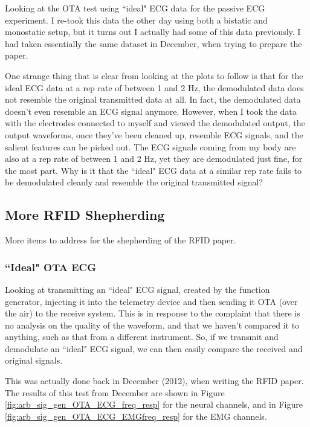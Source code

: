 \documentclass[12pt,onecolumn,titlepage]{article}
\begin{document}
\indent \indent Looking at the OTA test using ``ideal" ECG data for the passive ECG experiment. I re-took this data the other day using both a bistatic and monostatic setup, but it turns out I actually had some of this data previously. I had taken essentially the same dataset in December, when trying to prepare the paper.

One strange thing that is clear from looking at the plots to follow is that for the ideal ECG data at a rep rate of between 1 and 2 Hz, the demodulated data does not resemble the original transmitted data at all. In fact, the demodulated data doesn't even resemble an ECG signal anymore. However, when I took the data with the electrodes connected to myself and viewed the demodulated output, the output waveforms, once they've been cleaned up, resemble ECG signals, and the salient features can be picked out. The ECG signals coming from my body are also at a rep rate of between 1 and 2 Hz, yet they are demodulated just fine, for the most part. Why is it that the ``ideal" ECG data at a similar rep rate fails to be demodulated cleanly and resemble the original transmitted signal?

\subsection{More RFID Shepherding}
\indent \indent More items to address for the shepherding of the RFID paper. 

\subsubsection{``Ideal" OTA ECG}
\indent \indent Looking at transmitting an ``ideal" ECG signal, created by the function generator, injecting it into the telemetry device and then sending it OTA (over the air) to the receive system. This is in response to the complaint that there is no analysis on the quality of the waveform, and that we haven't compared it to anything, such as that from a different instrument. So, if we transmit and demodulate an ``ideal" ECG signal, we can then easily compare the received and original signals.

This was actually done back in December (2012), when writing the RFID paper. The results of this test from December are shown in Figure \ref{fig:arb_sig_gen_OTA_ECG_freq_resp} for the neural channels, and in Figure \ref{fig:arb_sig_gen_OTA_ECG_EMGfreq_resp} for the EMG channels.
\end{document}
